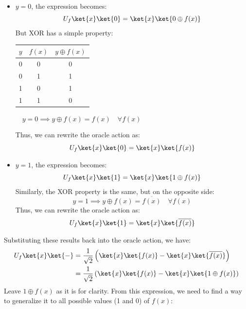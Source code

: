 \begin{itemize}
    \item $y = 0$, the expression becomes:
    \begin{equation*}
        U_f \ket{x}\ket{0} = \ket{x} \ket{0 \oplus f(x)}
    \end{equation*}
    But XOR has a simple property:
    \begin{center}
        \begin{tabular}{@{} c c c @{}}
            \toprule
            $y$ & $f(x)$ & $y \oplus f(x)$ \\
            \midrule
            0 & 0 & 0 \\
            0 & 1 & 1 \\
            1 & 0 & 1 \\
            1 & 1 & 0 \\
            \bottomrule
        \end{tabular}
        $\quad y = 0 \implies y \oplus f(x) = f(x) \quad \forall f(x)$
    \end{center}
    Thus, we can rewrite the oracle action as:
    \begin{equation*}
        U_f \ket{x}\ket{0} = \ket{x} \ket{f(x)}
    \end{equation*}

    \item $y = 1$, the expression becomes:
    \begin{equation*}
        U_f \ket{x}\ket{1} = \ket{x} \ket{1 \oplus f(x)}
    \end{equation*}
    Similarly, the XOR property is the same, but on the opposite side:
    \begin{equation*}
        y = 1 \implies y \oplus f(x) = \overline{f(x)} \quad \forall f(x)
    \end{equation*}
    Thus, we can rewrite the oracle action as:
    \begin{equation*}
        U_f \ket{x}\ket{1} = \ket{x} \ket{\overline{f(x)}}
    \end{equation*}
\end{itemize}
Substituting these results back into the oracle action, we have:
\begin{align*}
    U_f\ket{x}\ket{-} &= \frac{1}{\sqrt{2}} \left(
        \ket{x}\ket{f(x)} - \ket{x}\ket{\overline{f(x)}}
    \right) \\
    &= \frac{1}{\sqrt{2}} \left(
        \ket{x}\ket{f(x)} - \ket{x}\ket{1 \oplus f(x)}
    \right)
\end{align*}
Leave $1 \oplus f(x)$ as it is for clarity. From this expression, we need to find a way to generalize it to all possible values (1 and 0) of $f(x)$:
